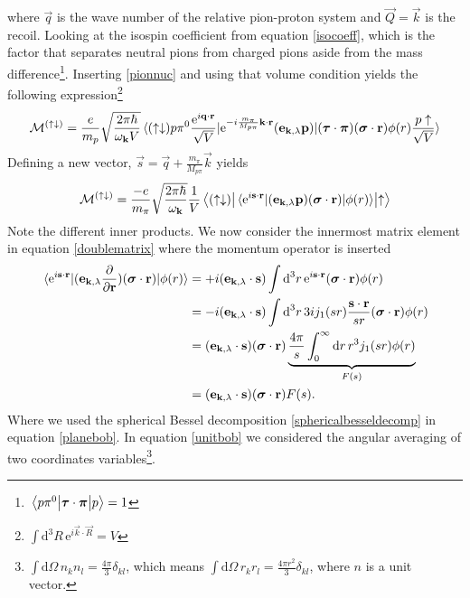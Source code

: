 where $\vec{q}$ is the wave number of the relative pion-proton system and $\vec{Q}=\vec{k}$ is the recoil. Looking at the isospin coefficient from equation \eqref{isocoeff}, which is the factor that separates neutral pions from charged pions aside from the mass difference\footnote{$\mel{p\pi^0}{\bm{\mathrm{\tau}}\cdot\bm{\mathrm{\pi}}}{p}=1$}. Inserting \eqref{pionnuc} and using that volume condition yields the following expression\footnote{$\int \text{d}^3R \, \text{e}^{i\vec{k}\cdot\vec{R}}=V$}
\begin{equation} \label{MatrixSpinupdown2}
	\mathcal{M}^{(\uparrow\downarrow)} = \frac{e}{m_p} \sqrt{\frac{2\pi\hbar}{\omega_{\bm{\mathrm{k}}}V}} \mel*{(\uparrow\downarrow)p\pi^0 \frac{\text{e}^{i\bm{\mathrm{q}}\cdot \bm{\mathrm{r}}}}{\sqrt{V}}}{\text{e}^{-i\frac{m_\pi}{M_{p\pi}}\bm{\mathrm{k}}\cdot\bm{\mathrm{r}}}(\bm{\mathrm{e}}_{\bm{\mathrm{k}},\lambda}\bm{\mathrm{p}})}{(\bm{\mathrm{\tau}}\cdot\bm{\mathrm{\pi}})(\bm{\mathrm{\sigma}}\cdot\bm{\mathrm{r}})\phi(r) \frac{p\uparrow}{\sqrt{V}}} 
\end{equation}
Defining a new vector, $\vec{s}=\vec{q}+\frac{m_\pi}{M_{p\pi}}\vec{k}$ yields
\begin{equation}\label{doublematrix}
	\mathcal{M}^{(\uparrow\downarrow)} = \frac{-e}{m_\pi} \sqrt{\frac{2\pi\hbar}{\omega_{\bm{\mathrm{k}}}}} \frac{1}{V} \mel{(\uparrow \downarrow)}{\mel*{\text{e}^{i\bm{\mathrm{s}}\cdot\bm{\mathrm{r}}}}{(\bm{\mathrm{e}}_{\bm{\mathrm{k}},\lambda}\bm{\mathrm{p}})(\bm{\mathrm{\sigma}}\cdot\bm{\mathrm{r}})}{\phi(r)}}{\uparrow}
\end{equation}
Note the different inner products. We now consider the innermost matrix element in equation \eqref{doublematrix} where the momentum operator is inserted
\begin{align}
	\mel*{\text{e}^{i\bm{\mathrm{s}}\cdot\bm{\mathrm{r}}}}{(\bm{\mathrm{e}}_{\bm{\mathrm{k}},\lambda}\frac{\partial}{\partial \bm{\mathrm{r}}})(\bm{\mathrm{\sigma}}\cdot \bm{\mathrm{r}})}{\phi(r)} &=+i(\bm{\mathrm{e}}_{\bm{\mathrm{k}},\lambda}\cdot \bm{\mathrm{s}}) \int \text{d}^3 r \, \text{e}^{i\bm{\mathrm{s}}\cdot\bm{\mathrm{r}}}(\bm{\mathrm{\sigma}}\cdot \bm{\mathrm{r}}) \phi(r) \\ 
	&= -i(\bm{\mathrm{e}}_{\bm{\mathrm{k}},\lambda}\cdot \bm{\mathrm{s}}) \int \text{d}^3 r \, 3 i j_1(sr) \frac{\bm{\mathrm{s}}\cdot \bm{\mathrm{r}}}{sr}(\bm{\mathrm{\sigma}}\cdot \bm{\mathrm{r}}) \phi(r)  \label{planebob}\\
	&= (\bm{\mathrm{e}}_{\bm{\mathrm{k}},\lambda}\cdot \bm{\mathrm{s}})(\bm{\mathrm{\sigma}}\cdot \bm{\mathrm{r}}) \underbrace{\frac{4\pi}{s} \int_0^\infty \text{d}r \, r^3 j_1(sr) \phi(r)}_{F(s)} \label{unitbob} \\
	&= (\bm{\mathrm{e}}_{\bm{\mathrm{k}},\lambda}\cdot \bm{\mathrm{s}})(\bm{\mathrm{\sigma}}\cdot \bm{\mathrm{r}}) F(s).
\end{align}
Where we used the spherical Bessel decomposition \eqref{sphericalbesseldecomp} in equation \eqref{planebob}. In equation \eqref{unitbob} we considered the angular averaging of two coordinates variables\footnote{$\int \text{d}\Omega \, n_k n_l =\frac{4\pi}{3}\delta_{kl}$, which means $\int \text{d}\Omega \, r_k r_l =\frac{4\pi r^2}{3}\delta_{kl}$, where $n$ is a unit vector.}.

